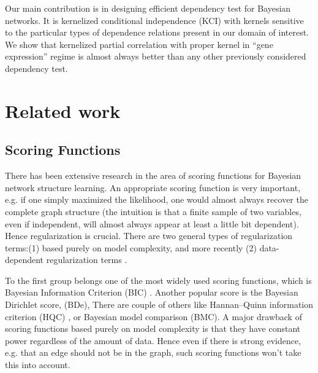 \documentclass{article} %
\begin{document}
Our main contribution is in designing efficient dependency test
for Bayesian networks. It is kernelized conditional independence (KCI) with
kernels sensitive to the particular types of dependence relations present in our domain of interest. We show
that kernelized partial correlation with proper kernel in ``gene expression''
regime is almost always better than any other previously considered
dependency test. 


\section{Related work}

\subsection{Scoring Functions}
There has been extensive research in the area of scoring functions for
Bayesian network structure learning. An appropriate scoring function is very important, e.g. if one simply maximized the likelihood, one would almost always recover the complete graph structure (the intuition is that a finite sample of two variables, even if independent, will almost always appear at least a little bit dependent).  Hence regularization is crucial.  There are two general types of regularization terms:(1) based purely on model complexity, and more recently (2) data-dependent regularization terms \cite{brenner2013sparsityboost}.

To the first group belongs one of the most widely used scoring functions, which is Bayesian Information Criterion (BIC) \cite{schwarz1978estimating}.  Another popular score is the Bayesian Dirichlet score, (BDe), There are couple of others like Hannan–Quinn information criterion (HQC) \cite{hannan1979determination},
or Bayesian model comparison (BMC). A major drawback of scoring functions based purely on model complexity is that they have constant power regardless of the amount of data.  Hence even if there is strong evidence, e.g. that an edge should not be in the graph, such scoring functions won't take this into account.
\end{document}
